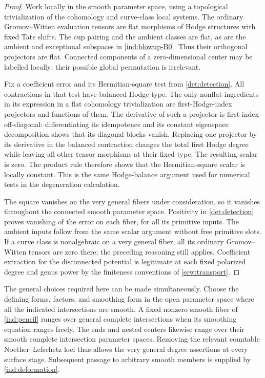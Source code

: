\begin{proof}
Work locally in the smooth parameter space, using a topological
trivialization of the cohomology and curve-class local systems. The
ordinary Gromov--Witten evaluation tensors are flat morphisms of
Hodge structures with fixed Tate shifts. The cup pairing and the
ambient classes are flat, as are the ambient and exceptional
subspaces in \eqref{ind:blowup-B0}. Thus their orthogonal projectors
are flat. Connected components of a zero-dimensional center may be
labelled locally; their possible global permutation is irrelevant.

Fix a coefficient error and its Hermitian-square test from
\cref{det:detection}. All contractions in that test have balanced
Hodge type. The only nonflat ingredients in its expression in a
flat cohomology trivialization are first-Hodge-index projectors and
functions of them. The derivative of such a projector is
first-index off-diagonal: differentiating its idempotence and its
constant eigenspace decomposition shows that its diagonal blocks
vanish. Replacing one projector by its derivative in the balanced
contraction changes the total first Hodge degree while leaving all
other tensor morphisms at their fixed type. The resulting scalar is
zero. The product rule therefore shows that the Hermitian-square
scalar is locally constant. This is the same Hodge-balance argument
used for numerical tests in the degeneration calculation.

The square vanishes on the very general fibers under consideration,
so it vanishes throughout the connected smooth parameter space.
Positivity in \cref{det:detection} proves vanishing of the error on
each fiber, for all its primitive inputs. The ambient inputs follow
from the same scalar argument without free primitive slots. If a
curve class is nonalgebraic on a very general fiber, all its ordinary
Gromov--Witten tensors are zero there; the preceding reasoning still
applies. Coefficient extraction for the disconnected potential is
legitimate at each fixed polarized degree and genus power by the
finiteness conventions of \cref{sew:transport}.
\end{proof}

The general choices required here can be made simultaneously. Choose
the defining forms, factors, and smoothing form in the open parameter
space where all the indicated intersections are smooth. A fixed
nonzero smooth fiber of \eqref{ind:pencil} ranges over general
complete intersections when its smoothing equation ranges freely.
The ends and nested centers likewise range over their smooth complete
intersection parameter spaces. Removing the relevant countable
Noether--Lefschetz loci thus allows the very general degree assertions
at every surface stage. Subsequent passage to arbitrary smooth
members is supplied by \cref{ind:deformation}.

